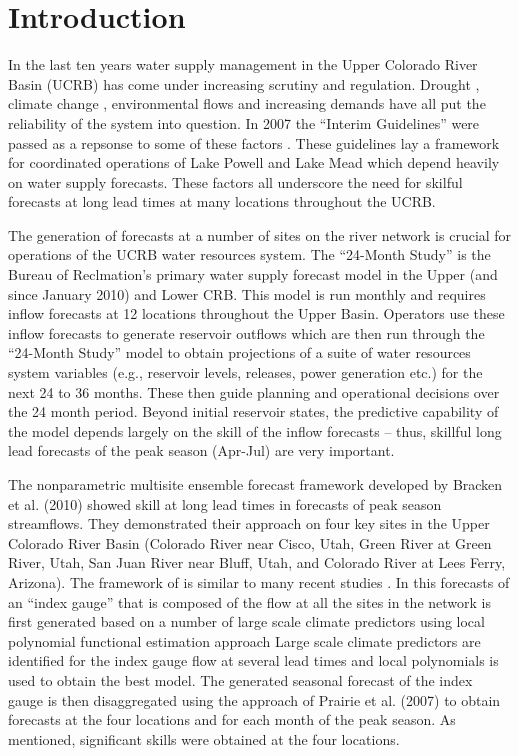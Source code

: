 \documentclass[final,5p,times,twocolumn,authoryear]{elsarticle}
\begin{document}
\linenumbers


\section{Introduction}
In the last ten years water supply management in the Upper Colorado River Basin (UCRB) has come under increasing scrutiny and regulation. Drought \citep{Fulp:2005wy}, climate change \citep{Balaji2009}, environmental flows and increasing demands \citep{USDepartmentoftheInterior:2008vl} have all put the reliability of the system into question.  In 2007 the ``Interim Guidelines'' were passed as a repsonse to some of these factors \citep{USDepartmentoftheInterior:2007ua}.  These guidelines lay a framework for coordinated operations of Lake Powell and Lake Mead which depend heavily on water supply forecasts.   These factors all underscore the need for skilful forecasts at long lead times at many locations throughout the UCRB.  

The generation of forecasts at a number of sites on the river network is crucial for operations of the UCRB water resources system.  The ``24-Month Study'' is the Bureau of Reclmation's primary water supply forecast model in the Upper (and since January 2010) and Lower CRB.  This model is run monthly and requires inflow forecasts at 12 locations throughout the Upper Basin.  Operators use these inflow forecasts to generate reservoir outflows which are then run through the ``24-Month Study'' model to obtain projections of a suite of water resources system variables (e.g., reservoir levels, releases, power generation etc.) for the next 24 to 36 months. These then guide planning and operational decisions over the 24 month period. Beyond initial reservoir states, the predictive capability of the model depends largely on the skill of the inﬂow forecasts -- thus, skillful long lead forecasts of the peak season (Apr-Jul) are very important.


The nonparametric multisite ensemble forecast framework developed by Bracken et al. (2010) showed skill at long lead times in forecasts of peak season streamflows. They demonstrated their approach on four key sites in the Upper Colorado River Basin (Colorado River near Cisco, Utah, Green River at Green River, Utah, San Juan River near Bluﬀ, Utah, and Colorado River at Lees Ferry, Arizona). The framework of \cite{Bracken:2010cw} is similar to many recent studies \citep{Moradkhani:2010tt,Opitz-Stapleton2007,Regonda2006,Grantz:2005ve}. In this forecasts of an ``index gauge'' that is composed of the ﬂow at all the sites in the network is first generated based on a number of large scale climate predictors using local polynomial functional estimation approach Large scale climate predictors are identified for the index gauge flow at several lead times and local polynomials is used to obtain the best model. The generated seasonal forecast of the index gauge is then disaggregated using the approach of Prairie et al. (2007) to obtain forecasts at the four locations and for each month of the peak season.  As mentioned, significant skills were obtained at the four locations.
\end{document}
